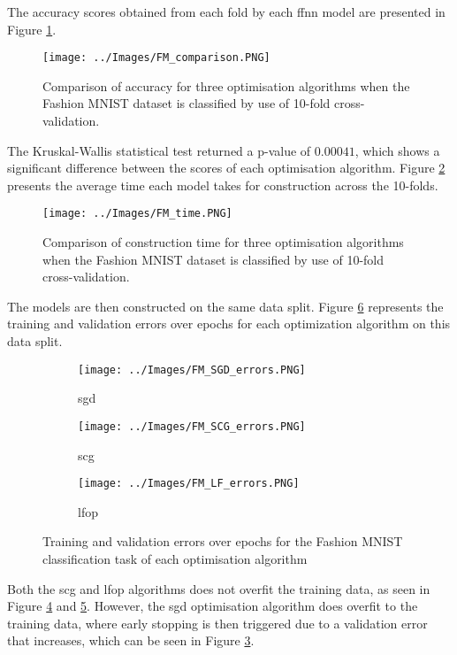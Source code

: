 \documentclass[10pt, conference]{IEEEtran}
\begin{document}
The accuracy scores obtained from each fold by each \acrshort{ffnn}
model are presented in Figure \ref{fig:FM_comparison}.
\begin{figure}[H]
    \centerline{\texttt{[image: ../Images/FM\_comparison.PNG]}}
    \caption{Comparison of accuracy for three optimisation algorithms when the Fashion MNIST dataset is classified by use of 10-fold cross-validation.}
    \label{fig:FM_comparison}
\end{figure}
The Kruskal-Wallis statistical test returned a p-value of $0.00041$, which shows a significant
difference between the scores of each optimisation algorithm. Figure \ref{fig:FM_time}
presents the average time each model takes for construction across the 10-folds.
\begin{figure}[H]
    \centerline{\texttt{[image: ../Images/FM\_time.PNG]}}
    \caption{Comparison of construction time for three optimisation algorithms when the Fashion MNIST dataset is classified by use of 10-fold cross-validation.}
    \label{fig:FM_time}
\end{figure}

The models are then constructed on the same data split. Figure \ref{fig:FM_errors} represents
the training and validation errors over epochs for each optimization algorithm on this data split.
\begin{figure}[H]
    \centering
    \begin{subfigure}[b]{0.23\textwidth}
        \centering
        \texttt{[image: ../Images/FM\_SGD\_errors.PNG]}
        \caption{\acrshort{sgd}}
        \label{fig:FM_SGD_errors}
    \end{subfigure}
    \hfill
    \begin{subfigure}[b]{0.23\textwidth}
        \centering
        \texttt{[image: ../Images/FM\_SCG\_errors.PNG]}
        \caption{\acrshort{scg}}
        \label{fig:FM_SCG_errors}
    \end{subfigure}
    \begin{subfigure}[b]{0.23\textwidth}
        \centering
        \texttt{[image: ../Images/FM\_LF\_errors.PNG]}
        \caption{\acrshort{lfop}}
        \label{fig:FM_LF_errors}
    \end{subfigure}
    \caption{Training and validation errors over epochs for the Fashion MNIST classification task of each optimisation algorithm}
    \label{fig:FM_errors}
\end{figure}
Both the \acrshort{scg} and \acrshort{lfop} algorithms does not overfit the training data, as seen in Figure \ref{fig:FM_SCG_errors}
and \ref{fig:FM_LF_errors}. However, the \acrshort{sgd} optimisation algorithm does overfit to the training data, where early
stopping is then triggered due to a validation error that increases, which can be seen in Figure \ref{fig:FM_SGD_errors}.
\end{document}
